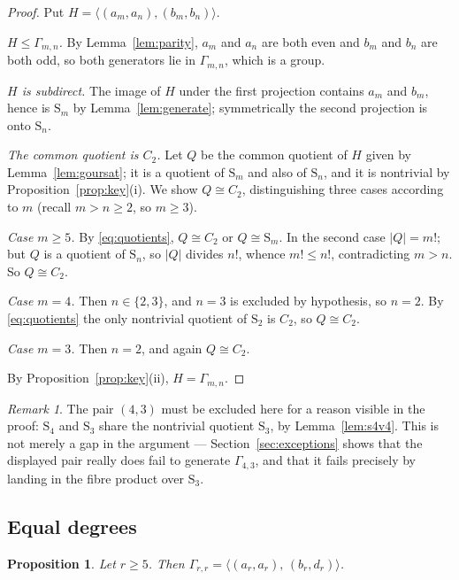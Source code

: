 \documentclass[11pt]{article}
\theoremstyle{plain}
\newtheorem{proposition}[theorem]{Proposition}
\theoremstyle{definition}
\theoremstyle{remark}
\newtheorem{remark}[theorem]{Remark}
\numberwithin{equation}{section}
\newcommand{\Sym}{\mathrm{S}}
\newcommand{\Gam}{\Gamma}
\begin{document}
\begin{proof}
Put $H = \langle (a_m,a_n), (b_m,b_n)\rangle$.

\emph{$H \le \Gam_{m,n}$.} By Lemma~\ref{lem:parity}, $a_m$ and $a_n$ are both even and $b_m$ and
$b_n$ are both odd, so both generators lie in $\Gam_{m,n}$, which is a group.

\emph{$H$ is subdirect.} The image of $H$ under the first projection contains $a_m$ and $b_m$,
hence is $\Sym_m$ by Lemma~\ref{lem:generate}; symmetrically the second projection is onto
$\Sym_n$.

\emph{The common quotient is $C_2$.} Let $Q$ be the common quotient of $H$ given by
Lemma~\ref{lem:goursat}; it is a quotient of $\Sym_m$ and also of $\Sym_n$, and it is nontrivial
by Proposition~\ref{prop:key}(i). We show $Q \cong C_2$, distinguishing three cases according to
$m$ (recall $m > n \ge 2$, so $m \ge 3$).

\emph{Case $m \ge 5$.} By \eqref{eq:quotients}, $Q \cong C_2$ or $Q \cong \Sym_m$. In the second
case $|Q| = m!$; but $Q$ is a quotient of $\Sym_n$, so $|Q|$ divides $n!$, whence $m! \le n!$,
contradicting $m > n$. So $Q \cong C_2$.

\emph{Case $m = 4$.} Then $n \in \{2,3\}$, and $n = 3$ is excluded by hypothesis, so $n = 2$. By
\eqref{eq:quotients} the only nontrivial quotient of $\Sym_2$ is $C_2$, so $Q \cong C_2$.

\emph{Case $m = 3$.} Then $n = 2$, and again $Q \cong C_2$.

By Proposition~\ref{prop:key}(ii), $H = \Gam_{m,n}$.
\end{proof}

\begin{remark}
The pair $(4,3)$ must be excluded here for a reason visible in the proof: $\Sym_4$ and $\Sym_3$
share the nontrivial quotient $\Sym_3$, by Lemma~\ref{lem:s4v4}. This is not merely a gap in the
argument --- Section~\ref{sec:exceptions} shows that the displayed pair really does fail to
generate $\Gam_{4,3}$, and that it fails precisely by landing in the fibre product over $\Sym_3$.
\end{remark}

\subsection{Equal degrees}

\begin{proposition}
\label{prop:equal}
Let $r \ge 5$. Then $\Gam_{r,r} = \bigl\langle (a_r,a_r),\,(b_r,d_r)\bigr\rangle$.
\end{proposition}
\end{document}
